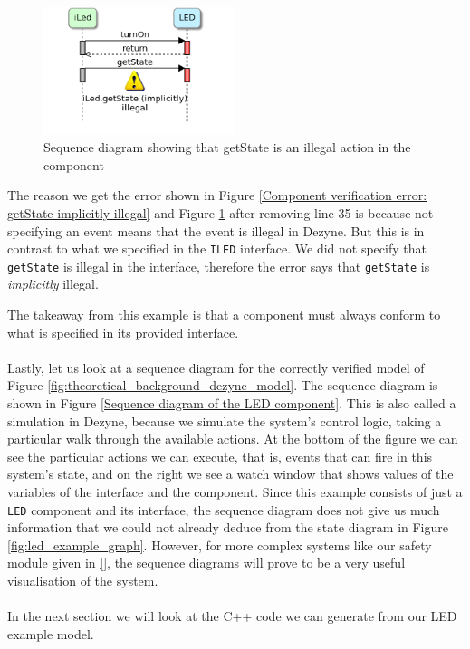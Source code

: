 \documentclass[12pt]{scrreprt}
\begin{document}
\begin{figure}[H]
    \centering
    \includegraphics[width=0.5\textwidth]{Figures/theoretical_background/getState_implicitly_illegal.png}
    \caption{Sequence diagram showing that getState is an illegal action in the component}
    \label{Sequence diagram showing that the component does not conform to the interface}
\end{figure}

The reason we get the error shown in Figure \ref{Component verification error: getState implicitly illegal} and Figure \ref{Sequence diagram showing that the component does not conform to the interface} after removing line 35 is because not specifying an event means that the event is illegal in Dezyne. But this is in contrast to what we specified in the \texttt{ILED} interface. We did not specify that \texttt{getState} is illegal in the interface, therefore the error says that \texttt{getState} is \textit{implicitly} illegal.
\par
The takeaway from this example is that a component must always conform to what is specified in its provided interface.
\\\\
Lastly, let us look at a sequence diagram for the correctly verified model of Figure \ref{fig:theoretical_background_dezyne_model}. The sequence diagram is shown in Figure \ref{Sequence diagram of the LED component}. This is also called a simulation in Dezyne, because we simulate the system's control logic, taking a particular walk through the available actions. At the bottom of the figure we can see the particular actions we can execute, that is, events that can fire in this system's state, and on the right we see a watch window that shows values of the variables of the interface and the component. Since this example consists of just a \texttt{LED} component and its interface, the sequence diagram does not give us much information that we could not already deduce from the state diagram in Figure \ref{fig:led_example_graph}. However, for more complex systems like our safety module given in \ref{}, the sequence diagrams will prove to be a very useful visualisation of the system.
\\\\
In the next section we will look at the C++ code we can generate from our LED example model.
\end{document}
